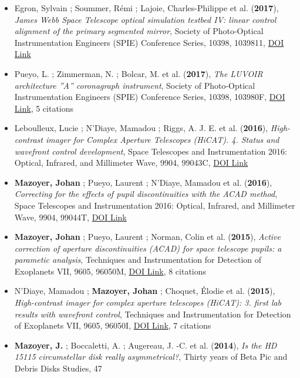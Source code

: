 \documentclass[11pt]{article}
\begin{document}
\begin{itemize}
\item Egron, Sylvain ; Soummer, R{\'e}mi ; Lajoie, Charles-Philippe et al. ({\bf2017}), {\it James Webb Space Telescope optical simulation testbed IV: linear control alignment of the primary segmented mirror}, Society of Photo-Optical Instrumentation Engineers (SPIE) Conference Series, 10398, 1039811, \href{https://doi.org/10.1117/12.2272981}{DOI Link}

\item Pueyo, L. ; Zimmerman, N. ; Bolcar, M. et al. ({\bf2017}), {\it The LUVOIR architecture ''A'' coronagraph instrument}, Society of Photo-Optical Instrumentation Engineers (SPIE) Conference Series, 10398, 103980F, \href{https://doi.org/10.1117/12.2274654}{DOI Link}, 5 citations

\item Leboulleux, Lucie ; N'Diaye, Mamadou ; Riggs, A. J. E. et al. ({\bf2016}), {\it High-contrast imager for Complex Aperture Telescopes (HiCAT). 4. Status and wavefront control development}, Space Telescopes and Instrumentation 2016: Optical, Infrared, and Millimeter Wave, 9904, 99043C, \href{https://doi.org/10.1117/12.2233640}{DOI Link}

\item {\bf Mazoyer, Johan} ; Pueyo, Laurent ; N'Diaye, Mamadou et al. ({\bf2016}), {\it Correcting for the effects of pupil discontinuities with the ACAD method}, Space Telescopes and Instrumentation 2016: Optical, Infrared, and Millimeter Wave, 9904, 99044T, \href{https://doi.org/10.1117/12.2232907}{DOI Link}

\item {\bf Mazoyer, Johan} ; Pueyo, Laurent ; Norman, Colin et al. ({\bf2015}), {\it Active correction of aperture discontinuities (ACAD) for space telescope pupils: a parametic analysis}, Techniques and Instrumentation for Detection of Exoplanets VII, 9605, 96050M, \href{https://doi.org/10.1117/12.2188692}{DOI Link}, 8 citations

\item N'Diaye, Mamadou ; {\bf Mazoyer, Johan} ; Choquet, {\'E}lodie et al. ({\bf2015}), {\it High-contrast imager for complex aperture telescopes (HiCAT): 3. first lab results with wavefront control}, Techniques and Instrumentation for Detection of Exoplanets VII, 9605, 96050I, \href{https://doi.org/10.1117/12.2188497}{DOI Link}, 7 citations

\item {\bf Mazoyer, J.} ; Boccaletti, A. ; Augereau, J. -C. et al. ({\bf2014}), {\it Is the HD 15115 circumstellar disk really asymmetrical?}, Thirty years of Beta Pic and Debris Disks Studies, 47


\end{itemize}
\end{document}
